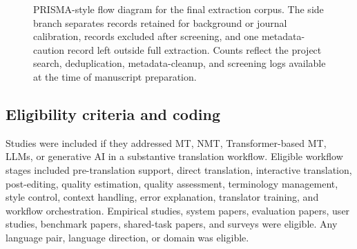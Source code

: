 \documentclass[11pt]{article}
\begin{document}
\begin{figure}[t]
\centering
{}
\caption{PRISMA-style flow diagram for the final extraction corpus. The side branch separates records retained for background or journal calibration, records excluded after screening, and one metadata-caution record left outside full extraction. Counts reflect the project search, deduplication, metadata-cleanup, and screening logs available at the time of manuscript preparation.}
\end{figure}

\subsection{Eligibility criteria and coding}
Studies were included if they addressed MT, NMT, Transformer-based MT, LLMs, or generative AI in a substantive translation workflow. Eligible workflow stages included pre-translation support, direct translation, interactive translation, post-editing, quality estimation, quality assessment, terminology management, style control, context handling, error explanation, translator training, and workflow orchestration. Empirical studies, system papers, evaluation papers, user studies, benchmark papers, shared-task papers, and surveys were eligible. Any language pair, language direction, or domain was eligible.
\end{document}
